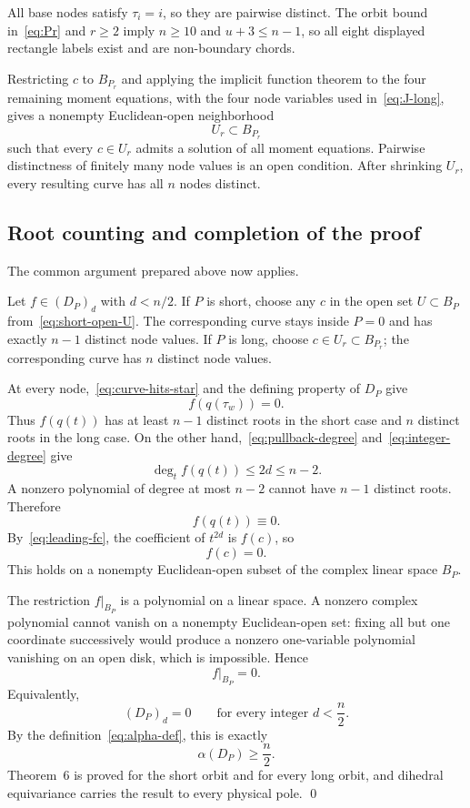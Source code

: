 \documentclass[11pt]{article}
\theoremstyle{definition}
\newcommand{\initial}{\alpha}
\begin{document}
All base nodes satisfy $\tau_i=i$, so they are pairwise distinct.  The orbit bound in~\eqref{eq:Pr} and $r\ge2$ imply $n\ge10$ and $u+3\le n-1$, so all eight displayed rectangle labels exist and are non-boundary chords.

Restricting $c$ to $B_{P_r}$ and applying the implicit function theorem to the four remaining moment equations, with the four node variables used in~\eqref{eq:J-long}, gives a nonempty Euclidean-open neighborhood
\[
U_r\subset B_{P_r}
\]
such that every $c\in U_r$ admits a solution of all moment equations.  Pairwise distinctness of finitely many node values is an open condition.  After shrinking $U_r$, every resulting curve has all $n$ nodes distinct.

\subsection{Root counting and completion of the proof}

The common argument prepared above now applies.

Let $f\in(D_P)_d$ with $d<n/2$.  If $P$ is short, choose any $c$ in the open set $U\subset B_P$ from~\eqref{eq:short-open-U}.  The corresponding curve stays inside $P=0$ and has exactly $n-1$ distinct node values.  If $P$ is long, choose $c\in U_r\subset B_{P_r}$; the corresponding curve has $n$ distinct node values.

At every node,~\eqref{eq:curve-hits-star} and the defining property of $D_P$ give
\[
f(q(\tau_w))=0.
\]
Thus $f(q(t))$ has at least $n-1$ distinct roots in the short case and $n$ distinct roots in the long case.  On the other hand,~\eqref{eq:pullback-degree} and~\eqref{eq:integer-degree} give
\[
\deg_t f(q(t))\le2d\le n-2.
\]
A nonzero polynomial of degree at most $n-2$ cannot have $n-1$ distinct roots.  Therefore
\[
f(q(t))\equiv0.
\]
By~\eqref{eq:leading-fc}, the coefficient of $t^{2d}$ is $f(c)$, so
\[
f(c)=0.
\]
This holds on a nonempty Euclidean-open subset of the complex linear space $B_P$.

The restriction $f|_{B_P}$ is a polynomial on a linear space.  A nonzero complex polynomial cannot vanish on a nonempty Euclidean-open set: fixing all but one coordinate successively would produce a nonzero one-variable polynomial vanishing on an open disk, which is impossible.  Hence
\[
f|_{B_P}=0.
\]
Equivalently,
\[
(D_P)_d=0
\qquad\text{for every integer }d<\frac n2.
\]
By the definition~\eqref{eq:alpha-def}, this is exactly
\[
\initial(D_P)\ge\frac n2.
\]
Theorem~6 is proved for the short orbit and for every long orbit, and dihedral equivariance carries the result to every physical pole.
\qed
\end{document}
